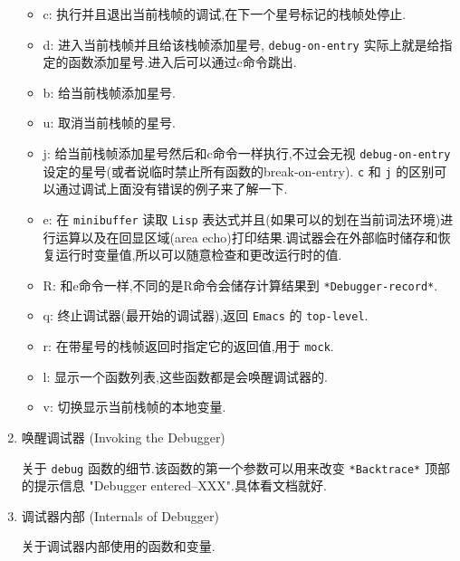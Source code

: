 \documentclass[11pt]{article}
\begin{document}
\begin{enumerate}
\begin{itemize}
\item c: 执行并且退出当前栈帧的调试,在下一个星号标记的栈帧处停止.
\item d: 进入当前栈帧并且给该栈帧添加星号, \texttt{debug-on-entry} 实际上就是给指定的函数添加星号.进入后可以通过c命令跳出.
\item b: 给当前栈帧添加星号.
\item u: 取消当前栈帧的星号.
\item j: 给当前栈帧添加星号然后和c命令一样执行,不过会无视 \texttt{debug-on-entry} 设定的星号(或者说临时禁止所有函数的break-on-entry). \texttt{c} 和 \texttt{j} 的区别可以通过调试上面没有错误的例子来了解一下.
\item e: 在 \texttt{minibuffer} 读取 \texttt{Lisp} 表达式并且(如果可以的划在当前词法环境)进行运算以及在回显区域(area echo)打印结果.调试器会在外部临时储存和恢复运行时变量值,所以可以随意检查和更改运行时的值.
\item R: 和e命令一样,不同的是R命令会储存计算结果到 \texttt{*Debugger-record*}.
\item q: 终止调试器(最开始的调试器),返回 \texttt{Emacs} 的 \texttt{top-level}.
\item r: 在带星号的栈帧返回时指定它的返回值,用于 \texttt{mock}.
\item l: 显示一个函数列表,这些函数都是会唤醒调试器的.
\item v: 切换显示当前栈帧的本地变量.
\end{itemize}


\item 唤醒调试器 (Invoking the Debugger)
\label{sec:org5b88c08}

关于 \texttt{debug} 函数的细节.该函数的第一个参数可以用来改变 \texttt{*Backtrace*} 顶部的提示信息 "Debugger entered--XXX".具体看文档就好.


\item 调试器内部 (Internals of Debugger)
\label{sec:org308d0f3}

关于调试器内部使用的函数和变量.


\end{enumerate}
\end{document}
